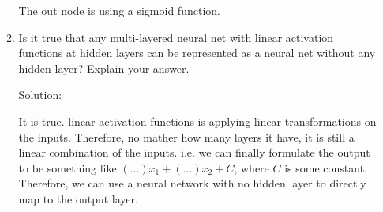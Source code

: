 \documentclass[12pt]{article}
\newcommand{\solu}{{\color{blue} Solution:}}
\begin{document}
\begin{enumerate}
\begin{enumerate}
            The out node is using a sigmoid function.
            \item Is it true that any multi-layered neural net with linear activation functions at hidden layers can be represented as a neural net without any hidden layer? Explain your answer.
            
            \solu

            It is true. linear activation functions is applying linear transformations on the inputs. Therefore, no mather how many layers it have, it is still a linear combination of the inputs. i.e. we can finally formulate the output to be something like $(\dots)x_1 + (\dots)x_2 + C$, where $C$ is some constant. Therefore, we can use a neural network with no hidden layer to directly map to the output layer.
                        
        \end{enumerate}
    \end{enumerate}
\end{document}
